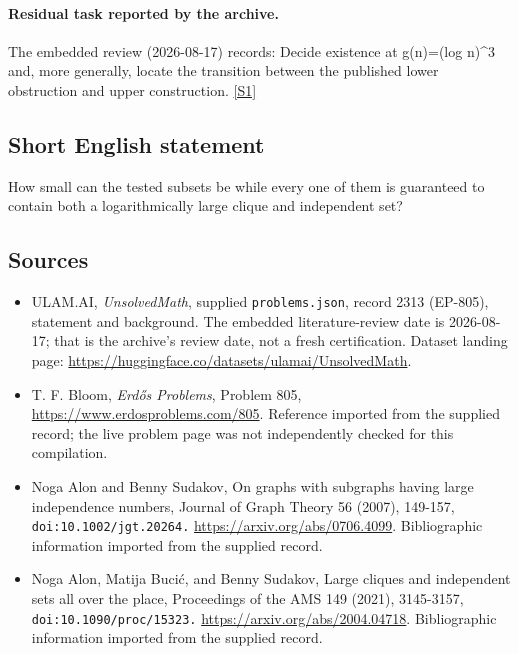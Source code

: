 \documentclass[11pt,a4paper]{article}
\newcommand{\sref}[2]{\hyperlink{source:#1:#2}{[S#2]}}
\begin{document}
\paragraph{Residual task reported by the archive.}

The embedded review (2026-08-17) records: Decide existence at g(n)=(log n)\textasciicircum{}3 and, more generally, locate the transition between the published lower obstruction and upper construction. \sref{2313}{1}

\subsection{Short English statement}

How small can the tested subsets be while every one of them is guaranteed to contain both a logarithmically large clique and independent set?

\subsection{Sources}

{\small

\begin{itemize}

\item[\hypertarget{source:2313:1}{S1}] ULAM.AI, \emph{UnsolvedMath}, supplied \texttt{problems.json}, record 2313 (EP-805), statement and background. The embedded literature-review date is 2026-08-17; that is the archive’s review date, not a fresh certification. Dataset landing page: \url{https://huggingface.co/datasets/ulamai/UnsolvedMath}.

\item[\hypertarget{source:2313:2}{S2}] T. F. Bloom, \emph{Erdős Problems}, Problem 805, \url{https://www.erdosproblems.com/805}. Reference imported from the supplied record; the live problem page was not independently checked for this compilation.

\item[\hypertarget{source:2313:3}{S3}] Noga Alon and Benny Sudakov, On graphs with subgraphs having large independence numbers, Journal of Graph Theory 56 (2007), 149-157, \nolinkurl{doi:10.1002/jgt.20264.} \url{https://arxiv.org/abs/0706.4099}. Bibliographic information imported from the supplied record.

\item[\hypertarget{source:2313:4}{S4}] Noga Alon, Matija Bucić, and Benny Sudakov, Large cliques and independent sets all over the place, Proceedings of the AMS 149 (2021), 3145-3157, \nolinkurl{doi:10.1090/proc/15323.} \url{https://arxiv.org/abs/2004.04718}. Bibliographic information imported from the supplied record.

\end{itemize}

}

\label{end:2313}
\end{document}
